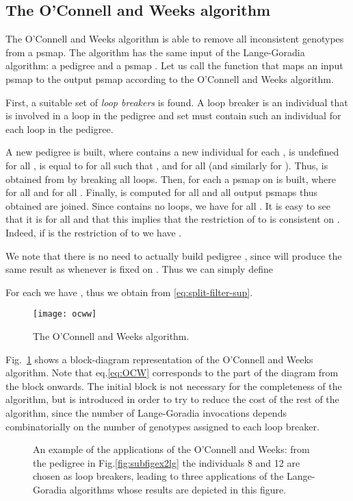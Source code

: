 \subsection{The O'Connell and Weeks algorithm}
\label{sec:ow}

The O'Connell and Weeks algorithm \cite{OConnellWeeks1999} is able to remove all
inconsistent genotypes from a psmap.
The algorithm has the same input of the Lange-Goradia algorithm:
a pedigree  and a psmap .
Let us call 
the function that maps an input psmap  to the output psmap  according to the
O'Connell and Weeks algorithm.

First, a suitable set 
of \emph{loop breakers} is found. 
A loop breaker is
an individual that is involved in a loop in the pedigree and set
 must contain such an individual for each loop in the pedigree.

A new pedigree  is built, where
 contains a new individual  for each ,
 is undefined for all , is equal to  for all  such that
, and 
for all  (and similarly for ).
Thus,  is obtained from  by breaking all loops.
Then, for each  a psmap  on  is built, where
 for all  and  for all .
Finally,  is computed for all 
and all output psmaps thus obtained are joined.
Since  contains no loops,
we have  for all .
It is easy to see that it is  for all  and
that this implies that the restriction of  to  is consistent on .
Indeed, if  is the restriction of  to  we have .

We note that there is no need to actually build pedigree ,
since  will produce the same result as  whenever
 is fixed on . Thus we can simply define

For each  we have , thus
we obtain  from \eqref{eq:split-filter-sup}.

\begin{figure}
  \centering
  \texttt{[image: ocww]}
  \caption{The O'Connell and Weeks algorithm.}
  \label{fig:OCW}
\end{figure}
Fig.~\ref{fig:OCW} shows a block-diagram representation of the O'Connell and Weeks algorithm.
Note that eq.\eqref{eq:OCW} corresponds to the part of the diagram from the  block
onwards. The initial  block is not necessary for the completeness of the algorithm,
but is introduced in order to try to reduce the cost of the rest of the algorithm,
since the number of Lange-Goradia invocations depends combinatorially on the number
of genotypes assigned to each loop breaker.

\begin{figure}
  \centering
  \caption{An example of the applications of the O'Connell and Weeks: from the
    pedigree in Fig.\ref{fig:subfigex2lg} the individuals 8 and 12 are chosen as
    loop breakers, leading to three applications of the Lange-Goradia algorithms
    whose results are depicted in this figure.}
  \label{fig:example2-decomposed}
\end{figure}


